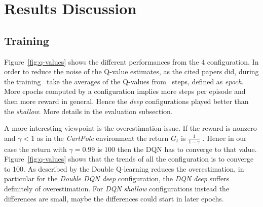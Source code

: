\section{Results Discussion}

\subsection{Training}


Figure~\ref{fig:q-values} shows the different performances from the 4 configuration. In order to reduce the noise of the Q-value estimates, as the cited papers did, during the training \auth~take the averages of the Q-values from \numepoch~steps, defined as \textit{epoch}. More epochs computed by a configuration implies more steps per episode and then more reward in general. Hence the \textit{deep} configurations played better than the \textit{shallow}. More details in the evaluation subsection.

A more interesting viewpoint is the overestimation issue. If the reward is nonzero and $\gamma < 1$ as in the \textit{CartPole} environment the return $G_t$ is $\frac{1}{1 - \gamma}$ \cite{Sutton:1998:IRL:551283}. Hence in our case the return with $\gamma = 0.99$ is $100$ then the DQN has to converge to that value.
Figure~\ref{fig:q-values} shows that the trends of all the configuration is to converge to 100. As described by \citeauthor{Hasselt:2016:DRL:3016100.3016191}  the Double Q-learning reduces the overestimation, in particular for the \textit{Double DQN deep} configuration, the \textit{DQN deep} suffers definitely of overestimation. For \textit{DQN shallow} configurations instead the differences are small, maybe the differences could start in later epochs.

